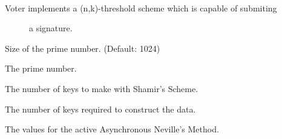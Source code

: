 \documentclass[letterpaper,10pt,english]{sphinxmanual}
\begin{document}
\begin{fulllineitems}
\label{\detokenize{index:Voter.Voter}}~\begin{description}
\item[{Voter implements a (n,k)-threshold scheme which is capable of submiting}] \leavevmode
a signature.

\end{description}

\begin{fulllineitems}
\label{\detokenize{index:Voter.Voter.prime_size}}
 \textendash{} Size of the prime number. (Default: 1024)

\end{fulllineitems}


\begin{fulllineitems}
\label{\detokenize{index:Voter.Voter.p}}
 \textendash{} The prime number.

\end{fulllineitems}


\begin{fulllineitems}
\label{\detokenize{index:Voter.Voter.n}}
 \textendash{} The number of keys to make with Shamir’s Scheme.

\end{fulllineitems}


\begin{fulllineitems}
\label{\detokenize{index:Voter.Voter.k}}
 \textendash{} The number of keys required to construct the data.

\end{fulllineitems}


\begin{fulllineitems}
\label{\detokenize{index:Voter.Voter.values}}
 \textendash{} The values for the active Asynchronous Neville’s Method.


\end{fulllineitems}
\end{fulllineitems}
\end{document}
